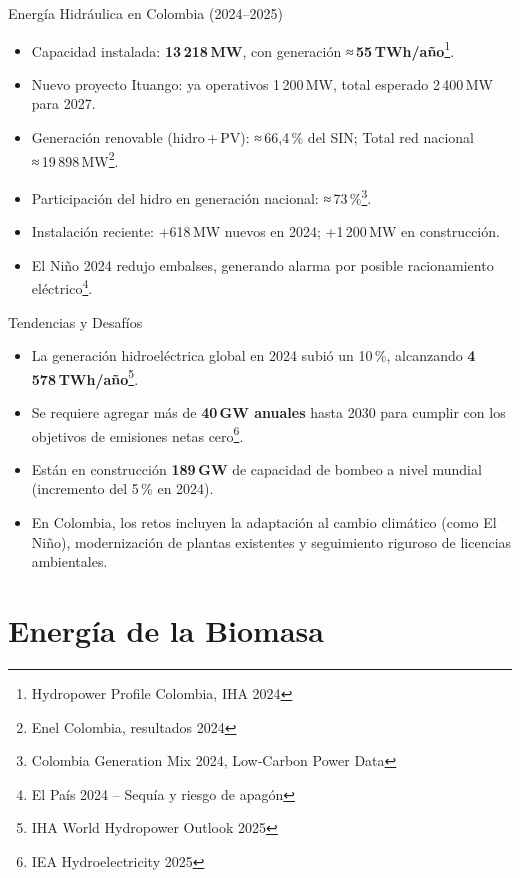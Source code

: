 \documentclass[main.tex]{subfiles}
\begin{document}
\begin{frame}{Energía Hidráulica en Colombia (2024–2025)}
    \small
    \begin{itemize}
        \item Capacidad instalada: \textbf{13 218 MW}, con generación ≈ \textbf{55 TWh/año}\footnote{Hydropower Profile Colombia, IHA 2024}.
        \item Nuevo proyecto Ituango: ya operativos 1 200 MW, total esperado 2 400 MW para 2027.
        \item Generación renovable (hidro + PV): ≈ 66,4 \% del SIN; Total red nacional ≈ 19 898 MW\footnote{Enel Colombia, resultados 2024}.
        \item Participación del hidro en generación nacional: ≈ 73 \%\footnote{Colombia Generation Mix 2024, Low‑Carbon Power Data}.
        \item Instalación reciente: +618 MW nuevos en 2024; +1 200 MW en construcción.
        \item El Niño 2024 redujo embalses, generando alarma por posible racionamiento eléctrico\footnote{El País 2024 – Sequía y riesgo de apagón}.
    \end{itemize}
\end{frame}


\begin{frame}{Tendencias y Desafíos}
    \begin{itemize}
        \item La generación hidroeléctrica global en 2024 subió un 10\,\%, alcanzando \textbf{4\,578 TWh/año}\footnote{IHA World Hydropower Outlook 2025}.
        \item Se requiere agregar más de \textbf{40\,GW anuales} hasta 2030 para cumplir con los objetivos de emisiones netas cero\footnote{IEA Hydroelectricity 2025}.
        \item Están en construcción \textbf{189 GW} de capacidad de bombeo a nivel mundial (incremento del 5\,\% en 2024).
        \item En Colombia, los retos incluyen la adaptación al cambio climático (como El Niño), modernización de plantas existentes y seguimiento riguroso de licencias ambientales.
    \end{itemize}
\end{frame}



\section{Energía de la Biomasa}
\end{document}
